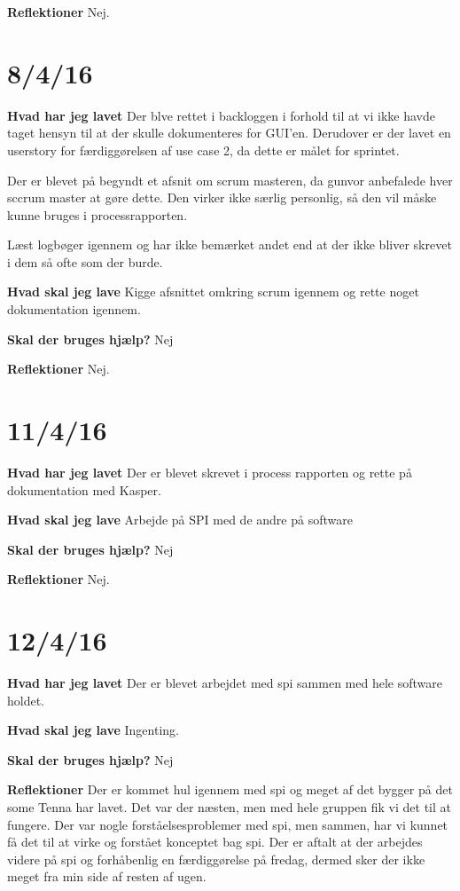 \documentclass{article}
\begin{document}
	\textbf{Reflektioner}
	Nej.
	
	\section{8/4/16}
	\textbf{Hvad har jeg lavet}
	Der blve rettet i backloggen i forhold til at vi ikke havde taget hensyn til at der skulle dokumenteres for GUI'en. Derudover er der lavet en userstory for færdiggørelsen af use case 2, da dette er målet for sprintet. \par
	Der er blevet på begyndt et afsnit om scrum masteren, da gunvor anbefalede hver sccrum master at gøre dette. Den virker ikke særlig personlig, så den vil måske kunne bruges i processrapporten. \par
	Læst logbøger igennem og har ikke bemærket andet end at der ikke bliver skrevet i dem så ofte som der burde.
	
	\textbf{Hvad skal jeg lave}
	Kigge afsnittet omkring scrum igennem og rette noget dokumentation igennem.
	
	\textbf{Skal der bruges hjælp?}
	Nej
	
	\textbf{Reflektioner}
	Nej.

	\section{11/4/16}
	\textbf{Hvad har jeg lavet}
	Der er blevet skrevet i process rapporten og rette på dokumentation med Kasper.
	
	\textbf{Hvad skal jeg lave}
	Arbejde på SPI med de andre på software
	
	\textbf{Skal der bruges hjælp?}
	Nej
	
	\textbf{Reflektioner}
	Nej.
	
	\section{12/4/16}
	\textbf{Hvad har jeg lavet}
	Der er blevet arbejdet med spi sammen med hele software holdet. 
	
	\textbf{Hvad skal jeg lave}
	Ingenting.
	
	\textbf{Skal der bruges hjælp?}
	Nej
	
	\textbf{Reflektioner}
	Der er kommet hul igennem med spi og meget af det bygger på det some Tenna har lavet. Det var der næsten, men med hele gruppen fik vi det til at fungere. Der var nogle forståelsesproblemer med spi, men sammen, har vi kunnet få det til at virke og forstået konceptet bag spi. Der er aftalt at der arbejdes videre på spi og forhåbenlig en færdiggørelse på fredag, dermed sker der ikke meget fra min side af resten af ugen.
	
\end{document}
